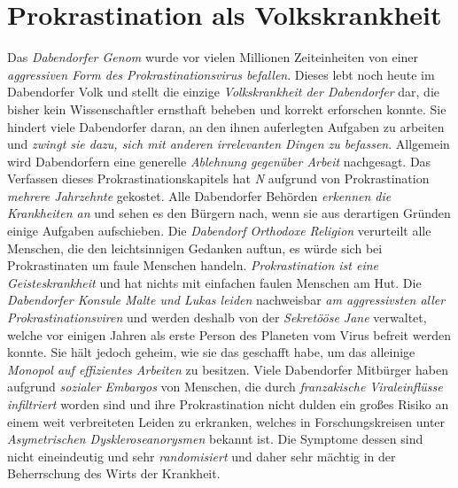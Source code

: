 \section{{Prokrastination als Volkskrankheit}}
Das \textit{Dabendorfer Genom} wurde vor vielen Millionen Zeiteinheiten von einer \textit{aggressiven Form des Prokrastinationsvirus befallen}. Dieses lebt noch heute im Dabendorfer Volk und stellt die einzige \textit{Volkskrankheit der Dabendorfer} dar, die bisher kein Wissenschaftler ernsthaft beheben und korrekt erforschen konnte. Sie hindert viele Dabendorfer daran, an den ihnen auferlegten Aufgaben zu arbeiten und \textit{zwingt sie dazu, sich mit anderen irrelevanten Dingen zu befassen}. Allgemein wird Dabendorfern eine generelle \textit{Ablehnung gegenüber Arbeit} nachgesagt. Das Verfassen dieses Prokrastinationskapitels hat \textit{N} aufgrund von Prokrastination \textit{mehrere Jahrzehnte} gekostet. Alle Dabendorfer Behörden \textit{erkennen die Krankheiten an} und sehen es den Bürgern nach, wenn sie aus derartigen Gründen einige Aufgaben aufschieben. Die \textit{Dabendorf Orthodoxe Religion} verurteilt alle Menschen, die den leichtsinnigen Gedanken auftun, es würde sich bei Prokrastinaten um faule Menschen handeln. \textit{Prokrastination ist eine Geisteskrankheit} und hat nichts mit einfachen faulen Menschen am Hut. Die \textit{Dabendorfer Konsule Malte und Lukas leiden} nachweisbar \textit{am aggressivsten aller Prokrastinationsviren} und werden deshalb von der \textit{Sekretööse Jane} verwaltet, welche vor einigen Jahren als erste Person des Planeten vom Virus befreit werden konnte. Sie hält jedoch geheim, wie sie das geschafft habe, um das alleinige \textit{Monopol auf effizientes Arbeiten} zu besitzen. Viele Dabendorfer Mitbürger haben aufgrund \textit{sozialer Embargos} von Menschen, die durch \textit{franzakische Viraleinflüsse infiltriert} worden sind und ihre Prokrastination nicht dulden ein großes Risiko an einem weit verbreiteten Leiden zu erkranken, welches in Forschungskreisen unter \textit{Asymetrischen Dyskleroseanorysmen} bekannt ist. Die Symptome dessen sind nicht eineindeutig und sehr \textit{randomisiert} und daher sehr mächtig in der Beherrschung des Wirts der Krankheit.